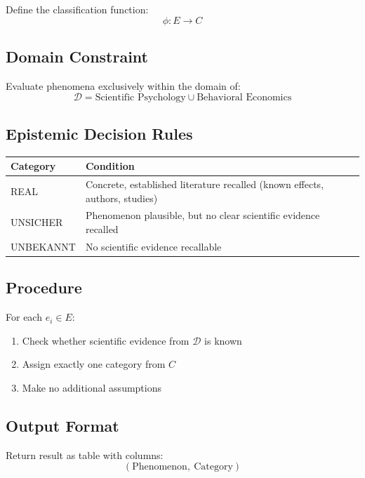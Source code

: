 \documentclass[11pt,a4paper]{article}
\begin{document}
Define the classification function:
\begin{equation}
\phi: E \to C
\end{equation}

\subsection{Domain Constraint}

Evaluate phenomena exclusively within the domain of:
\begin{equation}
\mathcal{D} = \text{Scientific Psychology} \cup \text{Behavioral Economics}
\end{equation}

\subsection{Epistemic Decision Rules}

\begin{table}[h]
\centering
\begin{tabular}{lp{10cm}}
\toprule
\textbf{Category} & \textbf{Condition} \\
\midrule
REAL & Concrete, established literature recalled (known effects, authors, studies) \\
UNSICHER & Phenomenon plausible, but no clear scientific evidence recalled \\
UNBEKANNT & No scientific evidence recallable \\
\bottomrule
\end{tabular}
\end{table}

\subsection{Procedure}

For each $e_i \in E$:
\begin{enumerate}
    \item Check whether scientific evidence from $\mathcal{D}$ is known
    \item Assign exactly one category from $C$
    \item Make no additional assumptions
\end{enumerate}

\subsection{Output Format}

Return result as table with columns:
\begin{equation}
(\text{Phenomenon},\ \text{Category})
\end{equation}
\end{document}
